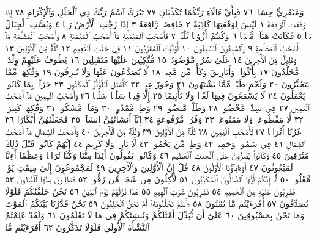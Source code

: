 وَعَبْقَرِيٍّ حِسَانࣲ ٧٦ فَبِأَيِّ ءَالَآءِ رَبِّكُمَا تُكَذِّبَانِ ٧٧
تَبَٰرَكَ ٱسْمُ رَبِّكَ ذِي ٱلْجَلَٰلِ وَٱلْإِكْرَامِ ٧٨
إِذَا وَقَعَتِ ٱلْوَاقِعَةُ ١ لَيْسَ لِوَقْعَتِهَا كَاذِبَةٌ ٢ خَافِضَةࣱ رَّافِعَةٌ ٣
إِذَا رُجَّتِ ٱلْأَرْضُ رَجࣰّا ٤ وَبُسَّتِ ٱلْجِبَالُ بَسࣰّا ٥ فَكَانَتْ
هَبَآءࣰ مُّنۢبَثࣰّا ٦ وَكُنتُمْ أَزْوَٰجࣰا ثَلَٰثَةࣰ ٧ فَأَصْحَٰبُ ٱلْمَيْمَنَةِ
مَآ أَصْحَٰبُ ٱلْمَيْمَنَةِ ٨ وَأَصْحَٰبُ ٱلْمَشْـَٔمَةِ مَآ أَصْحَٰبُ
ٱلْمَشْـَٔمَةِ ٩ وَٱلسَّٰبِقُونَ ٱلسَّٰبِقُونَ ١٠ أُو۟لَٰٓئِكَ ٱلْمُقَرَّبُونَ ١١
فِي جَنَّٰتِ ٱلنَّعِيمِ ١٢ ثُلَّةࣱ مِّنَ ٱلْأَوَّلِينَ ١٣ وَقَلِيلࣱ مِّنَ ٱلْأٓخِرِينَ ١٤
عَلَىٰ سُرُرࣲ مَّوْضُونَةࣲ ١٥ مُّتَّكِـِٔينَ عَلَيْهَا مُتَقَٰبِلِينَ ١٦
يَطُوفُ عَلَيْهِمْ وِلْدَٰنࣱ مُّخَلَّدُونَ ١٧ بِأَكْوَابࣲ وَأَبَارِيقَ وَكَأْسࣲ
مِّن مَّعِينࣲ ١٨ لَّا يُصَدَّعُونَ عَنْهَا وَلَا يُنزِفُونَ ١٩ وَفَٰكِهَةࣲ مِّمَّا
يَتَخَيَّرُونَ ٢٠ وَلَحْمِ طَيْرࣲ مِّمَّا يَشْتَهُونَ ٢١ وَحُورٌ عِينࣱ ٢٢ كَأَمْثَٰلِ
ٱللُّؤْلُؤِ ٱلْمَكْنُونِ ٢٣ جَزَآءَۢ بِمَا كَانُوا۟ يَعْمَلُونَ ٢٤ لَا يَسْمَعُونَ
فِيهَا لَغْوࣰا وَلَا تَأْثِيمًا ٢٥ إِلَّا قِيلࣰا سَلَٰمࣰا سَلَٰمࣰا ٢٦ وَأَصْحَٰبُ ٱلْيَمِينِ مَآ
أَصْحَٰبُ ٱلْيَمِينِ ٢٧ فِي سِدْرࣲ مَّخْضُودࣲ ٢٨ وَطَلْحࣲ مَّنضُودࣲ ٢٩ وَظِلࣲّ
مَّمْدُودࣲ ٣٠ وَمَآءࣲ مَّسْكُوبࣲ ٣١ وَفَٰكِهَةࣲ كَثِيرَةࣲ ٣٢ لَّا مَقْطُوعَةࣲ
وَلَا مَمْنُوعَةࣲ ٣٣ وَفُرُشࣲ مَّرْفُوعَةٍ ٣٤ إِنَّآ أَنشَأْنَٰهُنَّ إِنشَآءࣰ ٣٥
فَجَعَلْنَٰهُنَّ أَبْكَارًا ٣٦ عُرُبًا أَتْرَابࣰا ٣٧ لِّأَصْحَٰبِ ٱلْيَمِينِ ٣٨ ثُلَّةࣱ
مِّنَ ٱلْأَوَّلِينَ ٣٩ وَثُلَّةࣱ مِّنَ ٱلْأٓخِرِينَ ٤٠ وَأَصْحَٰبُ ٱلشِّمَالِ مَآ
أَصْحَٰبُ ٱلشِّمَالِ ٤١ فِي سَمُومࣲ وَحَمِيمࣲ ٤٢ وَظِلࣲّ مِّن يَحْمُومࣲ ٤٣
لَّا بَارِدࣲ وَلَا كَرِيمٍ ٤٤ إِنَّهُمْ كَانُوا۟ قَبْلَ ذَٰلِكَ مُتْرَفِينَ ٤٥ وَكَانُوا۟
يُصِرُّونَ عَلَى ٱلْحِنثِ ٱلْعَظِيمِ ٤٦ وَكَانُوا۟ يَقُولُونَ أَئِذَا مِتْنَا وَكُنَّا
تُرَابࣰا وَعِظَٰمًا أَءِنَّا لَمَبْعُوثُونَ ٤٧ أَوَءَابَآؤُنَا ٱلْأَوَّلُونَ ٤٨ قُلْ إِنَّ
ٱلْأَوَّلِينَ وَٱلْأٓخِرِينَ ٤٩ لَمَجْمُوعُونَ إِلَىٰ مِيقَٰتِ يَوْمࣲ مَّعْلُومࣲ ٥٠
ثُمَّ إِنَّكُمْ أَيُّهَا ٱلضَّآلُّونَ ٱلْمُكَذِّبُونَ ٥١ لَأٓكِلُونَ مِن شَجَرࣲ مِّن زَقُّومࣲ ٥٢
فَمَالِـُٔونَ مِنْهَا ٱلْبُطُونَ ٥٣ فَشَٰرِبُونَ عَلَيْهِ مِنَ ٱلْحَمِيمِ ٥٤ فَشَٰرِبُونَ
شُرْبَ ٱلْهِيمِ ٥٥ هَٰذَا نُزُلُهُمْ يَوْمَ ٱلدِّينِ ٥٦ نَحْنُ خَلَقْنَٰكُمْ فَلَوْلَا
تُصَدِّقُونَ ٥٧ أَفَرَءَيْتُم مَّا تُمْنُونَ ٥٨ ءَأَنتُمْ تَخْلُقُونَهُۥٓ أَمْ نَحْنُ
ٱلْخَٰلِقُونَ ٥٩ نَحْنُ قَدَّرْنَا بَيْنَكُمُ ٱلْمَوْتَ وَمَا نَحْنُ بِمَسْبُوقِينَ ٦٠
عَلَىٰٓ أَن نُّبَدِّلَ أَمْثَٰلَكُمْ وَنُنشِئَكُمْ فِي مَا لَا تَعْلَمُونَ ٦١ وَلَقَدْ
عَلِمْتُمُ ٱلنَّشْأَةَ ٱلْأُولَىٰ فَلَوْلَا تَذَكَّرُونَ ٦٢ أَفَرَءَيْتُم مَّا
